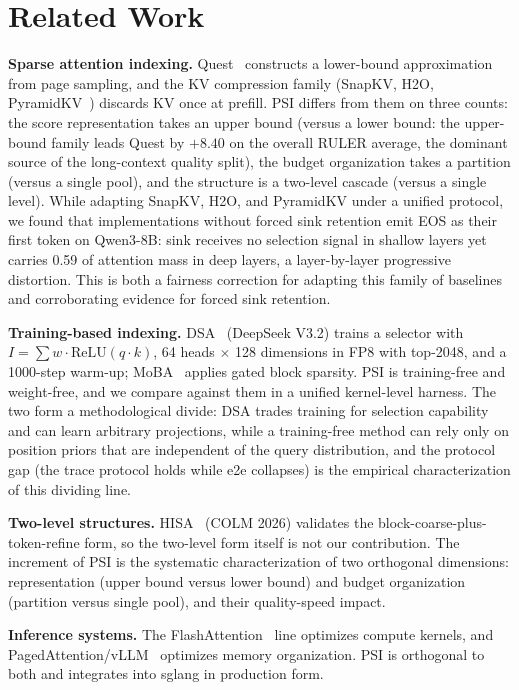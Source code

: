 \documentclass[11pt]{article}
\begin{document}
\section{Related Work}

\textbf{Sparse attention indexing.} Quest~\cite{quest} constructs a lower-bound approximation from page sampling, and the KV compression family (SnapKV, H2O, PyramidKV~\cite{snapkv,h2o,pyramidkv}) discards KV once at prefill. PSI differs from them on three counts: the score representation takes an upper bound (versus a lower bound: the upper-bound family leads Quest by $+8.40$ on the overall RULER average, the dominant source of the long-context quality split), the budget organization takes a partition (versus a single pool), and the structure is a two-level cascade (versus a single level). While adapting SnapKV, H2O, and PyramidKV under a unified protocol, we found that implementations without forced sink retention emit EOS as their first token on Qwen3-8B: sink receives no selection signal in shallow layers yet carries 0.59 of attention mass in deep layers, a layer-by-layer progressive distortion. This is both a fairness correction for adapting this family of baselines and corroborating evidence for forced sink retention.

\textbf{Training-based indexing.} DSA~\cite{dsa} (DeepSeek V3.2) trains a selector with $I=\sum w\cdot\mathrm{ReLU}(q\cdot k)$, 64 heads $\times$ 128 dimensions in FP8 with top-2048, and a 1000-step warm-up; MoBA~\cite{moba} applies gated block sparsity. PSI is training-free and weight-free, and we compare against them in a unified kernel-level harness. The two form a methodological divide: DSA trades training for selection capability and can learn arbitrary projections, while a training-free method can rely only on position priors that are independent of the query distribution, and the protocol gap (the trace protocol holds while e2e collapses) is the empirical characterization of this dividing line.

\textbf{Two-level structures.} HISA~\cite{hisa} (COLM 2026) validates the block-coarse-plus-token-refine form, so the two-level form itself is not our contribution. The increment of PSI is the systematic characterization of two orthogonal dimensions: representation (upper bound versus lower bound) and budget organization (partition versus single pool), and their quality-speed impact.

\textbf{Inference systems.} The FlashAttention~\cite{fa} line optimizes compute kernels, and PagedAttention/vLLM~\cite{vllm} optimizes memory organization. PSI is orthogonal to both and integrates into sglang in production form.
\end{document}
